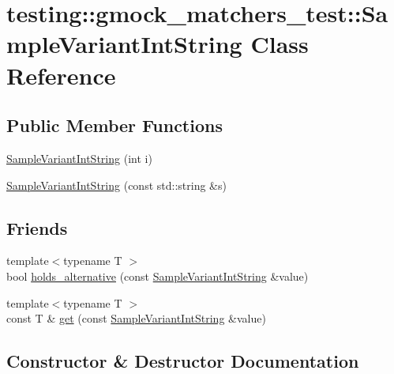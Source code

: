 \hypertarget{classtesting_1_1gmock__matchers__test_1_1SampleVariantIntString}{}\section{testing\+::gmock\+\_\+matchers\+\_\+test\+::Sample\+Variant\+Int\+String Class Reference}
\label{classtesting_1_1gmock__matchers__test_1_1SampleVariantIntString}
\subsection*{Public Member Functions}
\begin{DoxyCompactItemize}
\item 
\mbox{\hyperlink{classtesting_1_1gmock__matchers__test_1_1SampleVariantIntString_a362f135d65f8dd024202cc4908b510e2}{Sample\+Variant\+Int\+String}} (int i)
\item 
\mbox{\hyperlink{classtesting_1_1gmock__matchers__test_1_1SampleVariantIntString_a2cca84a8b8af0726efab2b28df5e2880}{Sample\+Variant\+Int\+String}} (const std\+::string \&s)
\end{DoxyCompactItemize}
\subsection*{Friends}
\begin{DoxyCompactItemize}
\item 
{\footnotesize template$<$typename T $>$ }\\bool \mbox{\hyperlink{classtesting_1_1gmock__matchers__test_1_1SampleVariantIntString_a3139754402f0352ddea2ba7823ad16f1}{holds\+\_\+alternative}} (const \mbox{\hyperlink{classtesting_1_1gmock__matchers__test_1_1SampleVariantIntString}{Sample\+Variant\+Int\+String}} \&value)
\item 
{\footnotesize template$<$typename T $>$ }\\const T \& \mbox{\hyperlink{classtesting_1_1gmock__matchers__test_1_1SampleVariantIntString_a492b2fd643a25c4345f56c68369ebd54}{get}} (const \mbox{\hyperlink{classtesting_1_1gmock__matchers__test_1_1SampleVariantIntString}{Sample\+Variant\+Int\+String}} \&value)
\end{DoxyCompactItemize}


\subsection{Constructor \& Destructor Documentation}
\mbox{\label{classtesting_1_1gmock__matchers__test_1_1SampleVariantIntString_a362f135d65f8dd024202cc4908b510e2}} 
